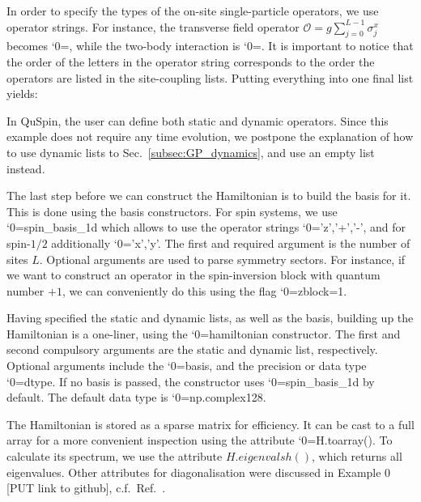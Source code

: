 \documentclass{SciPost}
\newcommand\0{\scalebox{-1}[1]{0}}
\let\svttfamily\ttfamily
\renewcommand\ttfamily{\svttfamily\catcode`0=\active }
\renewcommand\texttt{\bgroup\ttfamily\texttthelp}
\def\texttthelp#1{#1\egroup}
\newcommand{\JWcode}{example6.py}
\begin{document}
In order to specify the types of the on-site single-particle operators, we use operator strings. For instance, the transverse field operator $\mathcal{O}=g\sum_{j=0}^{L-1}\sigma^x_j$ becomes \texttt{['x',h\_field]}, while the two-body interaction is \texttt{['zz',J\_zz]}. It is important to notice that the order of the letters in the operator string corresponds to the order the operators are listed in the site-coupling lists. Putting everything into one final list yields:  

In QuSpin, the user can define both static and dynamic operators. Since this example does not require any time evolution, we postpone the explanation of how to use dynamic lists to Sec.~\ref{subsec:GP_dynamics}, and use an empty list instead.

The last step before we can construct the Hamiltonian is to build the basis for it. This is done using the basis constructors. For spin systems, we use \texttt{spin\_basis\_1d} which allows to use the operator strings \texttt{'z','+','-'}, and for spin-$1/2$ additionally \texttt{'x','y'}. The first and required argument is the number of sites $L$. Optional arguments are used to parse symmetry sectors. For instance, if we want to construct an operator in the spin-inversion block with quantum number $+1$, we can conveniently do this using the flag \texttt{zblock=1}.
 
Having specified the static and dynamic lists, as well as the basis, building up the Hamiltonian is a one-liner, using the \texttt{hamiltonian} constructor. The first and second compulsory arguments are the static and dynamic list, respectively. Optional arguments include the \texttt{basis}, and the precision or data type \texttt{dtype}. If no basis is passed, the constructor uses \texttt{spin\_basis\_1d} by default. The default data type is \texttt{np.complex128}.
 
The Hamiltonian is stored as a sparse matrix for efficiency. It can be cast to a full array for a more convenient inspection using the attribute \texttt{H.toarray()}. To calculate its spectrum, we use the attribute $H.eigenvalsh()$, which returns all eigenvalues. Other attributes for diagonalisation were discussed in Example 0 [PUT link to github], c.f.~Ref.~\cite{weinberg_17_quspin}.

\end{document}
